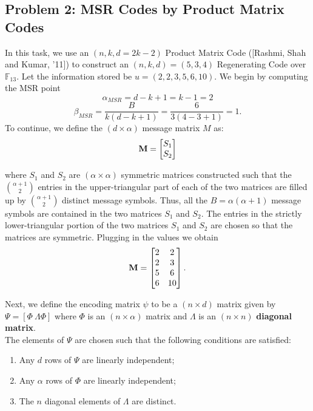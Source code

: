 \documentclass{article}
\begin{document}
\subsection*{Problem 2: MSR Codes by Product Matrix Codes}
In this task, we use an $(n,k,d=2k-2)$ Product Matrix Code ([Rashmi, Shah and Kumar, '11]) to construct an $(n, k, d) = (5, 3, 4)$ Regenerating Code over $\mathbb{F}_{13}$. Let the information stored be $u = (2, 2, 3, 5, 6, 10)$. 
We begin by computing the MSR point
\begin{equation*}
\alpha_{MSR} = d - k +1 = k-1 = 2
\end{equation*}
\begin{equation*}
\beta_{MSR}=\dfrac{B}{k(d-k+1)}=\dfrac{6}{3(4-3+1)}=1.
\end{equation*}
To continue, we define the $(d \times \alpha)$ message matrix $M$ as:
\begin{equation*}
\vb{M} = \begin{bmatrix} S_1\\ S_2 \end{bmatrix}
\end{equation*} 

where $S_1$ and $S_2$ are $(\alpha \times \alpha)$ symmetric matrices constructed such that the ${\alpha + 1}\choose{2}$ entries in the upper-triangular part of each of the two matrices are filled up by ${\alpha + 1}\choose{2}$ distinct message symbols. Thus, all the $B=\alpha(\alpha+1)$ message symbols are contained in the two matrices $S_1$ and $S_2$. The entries in the strictly lower-triangular portion of the two matrices $S_1$ and $S_2$ are chosen so that the matrices are symmetric. Plugging in the values we obtain
\begin{equation*}
\vb{M} =
\begin{bmatrix}
2 & 2 \\
2 & 3 \\
5 & 6 \\
6 & 10 \\
\end{bmatrix}.
\end{equation*}

Next, we define the encoding matrix $\psi $ to be a $(n\times d)$ matrix given by $\Psi = [\Phi\ \Lambda\Phi]$ where $\Phi$ is an $(n \times \alpha)$ matrix and $\Lambda$ is an $(n\times n)$ \textbf{diagonal matrix}.\\

The elements of $\Psi$ are chosen such that the following conditions are satisfied:
\begin{enumerate}
\item Any $d$ rows of $\Psi$ are linearly independent;
\item Any $\alpha$ rows of $\Phi$ are linearly independent;
\item The $n$ diagonal elements of $\Lambda$  are distinct.
\end{enumerate}
\end{document}
